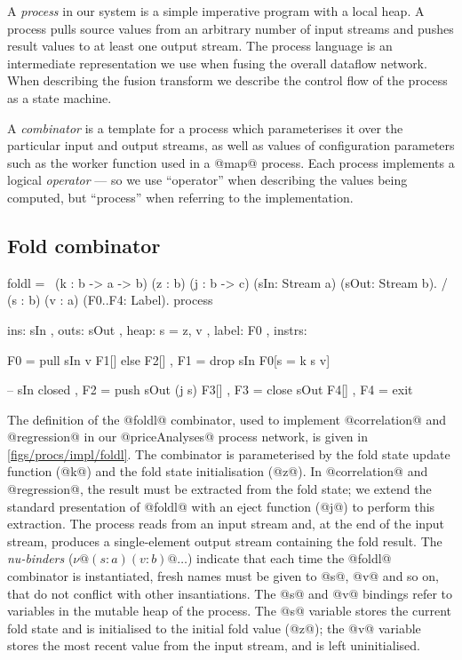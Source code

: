 A \emph{process} in our system is a simple imperative program with a local heap.
A process pulls source values from an arbitrary number of input streams and pushes result values to at least one output stream.
The process language is an intermediate representation we use when fusing the overall dataflow network.
When describing the fusion transform we describe the control flow of the process as a state machine.

A \emph{combinator} is a template for a process which parameterises it over the particular input and output streams, as well as values of configuration parameters such as the worker function used in a @map@ process.
Each process implements a logical \emph{operator} --- so we use ``operator'' when describing the values being computed, but ``process'' when referring to the implementation.


\subsection{Fold combinator}
\begin{process}[float,caption=Process implementation of \Hs/foldl/,label=figs/procs/impl/foldl]
foldl 
  = \ (k  : b -> a -> b) (z   : b) (j : b -> c)
      (sIn: Stream a)    (sOut: Stream b). 
    / (s  : b) (v : a)   (F0..F4: Label).
    process
     { ins:    { sIn  }
     , outs:   { sOut }
     , heap:   { s = z, v }
     , label:    F0
     , instrs: { F0 = pull  sIn     v  F1[] else F2[]
               , F1 = drop  sIn        F0[s = k s v]

               -- sIn closed
               , F2 = push  sOut (j s) F3[]
               , F3 = close sOut       F4[]
               , F4 = exit } }
\end{process}

The definition of the @foldl@ combinator, used to implement @correlation@ and @regression@ in our @priceAnalyses@ process network, is given in \cref{figs/procs/impl/foldl}.
The combinator is parameterised by the fold state update function (@k@) and the fold state initialisation (@z@).
In @correlation@ and @regression@, the result must be extracted from the fold state; we extend the standard presentation of @foldl@ with an eject function (@j@) to perform this extraction.
The process reads from an input stream and, at the end of the input stream, produces a single-element output stream containing the fold result.
The \emph{nu-binders} ($\nu@ (s : a) (v : b)@\ldots$) indicate that each time the @foldl@ combinator is instantiated, fresh names must be given to @s@, @v@ and so on, that do not conflict with other insantiations.
The @s@ and @v@ bindings refer to variables in the mutable heap of the process.
The @s@ variable stores the current fold state and is initialised to the initial fold value (@z@); the @v@ variable stores the most recent value from the input stream, and is left uninitialised.

